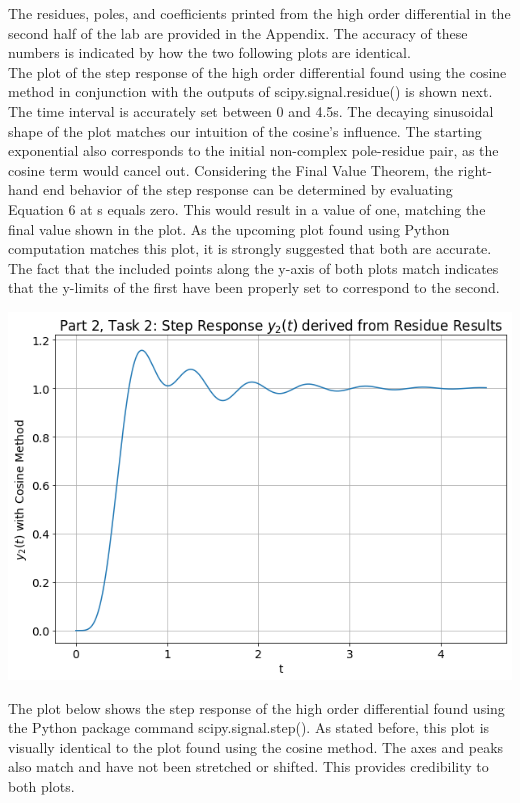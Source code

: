 \documentclass[12pt]{report}
\begin{document}
The residues, poles, and coefficients printed from the high order differential in the second half of the lab are provided in the Appendix. The accuracy of these numbers is indicated by how the two following plots are identical. \\

The plot of the step response of the high order differential found using the cosine method in conjunction with the outputs of scipy.signal.residue() is shown next. The time interval is accurately set between 0 and 4.5s. The decaying sinusoidal shape of the plot matches our intuition of the cosine's influence. The starting exponential also corresponds to the initial non-complex pole-residue pair, as the cosine term would cancel out. Considering the Final Value Theorem, the right-hand end behavior of the step response can be determined by evaluating Equation 6 at s equals zero. This would result in a value of one, matching the final value shown in the plot. As the upcoming plot found using Python computation matches this plot, it is strongly suggested that both are accurate. The fact that the included points along the y-axis of both plots match indicates that the y-limits of the first have been properly set to correspond to the second. \\

\begin{center}
	\includegraphics[scale = 0.6]{Lab 6 - Plots/Part2-Task2.png}\\[1.0 cm]
\end{center}

The plot below shows the step response of the high order differential found using the Python package command scipy.signal.step(). As stated before, this plot is visually identical to the plot found using the cosine method. The axes and peaks also match and have not been stretched or shifted. This provides credibility to both plots. 
\\
\end{document}
